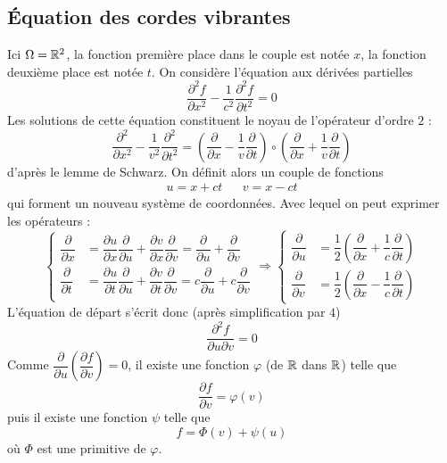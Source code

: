 \subsection{\'Equation des cordes vibrantes}
 Ici $\Omega=\mathbb{R}^2$, la fonction première place dans le couple est notée $x$, la fonction deuxième place est notée $t$. On considère l'équation aux dérivées partielles
\begin{displaymath}
 \dfrac{\partial ^2 f}{\partial x^2} -\dfrac{1}{c^2}\dfrac{\partial^2 f}{\partial t^2}=0
\end{displaymath}
Les solutions de cette équation constituent le noyau de l'opérateur d'ordre $2$ :
\begin{displaymath}
 \dfrac{\partial ^2 }{\partial x^2} -\dfrac{1}{v^2}\dfrac{\partial^2 }{\partial t^2} =
\left( \dfrac{\partial }{\partial x} -\dfrac{1}{v}\dfrac{\partial }{\partial t}\right) \circ 
\left( \dfrac{\partial }{\partial x} +\dfrac{1}{v}\dfrac{\partial }{\partial t}\right)
\end{displaymath}
d'après le lemme de Schwarz. On définit alors un couple de fonctions 
\begin{align*}
 u= x+ ct & & v=x-ct
\end{align*}
qui forment un nouveau système de coordonnées. Avec lequel on peut exprimer les opérateurs :
\begin{displaymath}
 \left\lbrace 
\begin{aligned}
 \dfrac{\partial }{\partial x} &= \dfrac{\partial u}{\partial x}\dfrac{\partial }{\partial u}+\dfrac{\partial v}{\partial x}\dfrac{\partial }{\partial v} 
= \dfrac{\partial }{\partial u}+\dfrac{\partial }{\partial v}\\
\dfrac{\partial }{\partial t} &= \dfrac{\partial u}{\partial t}\dfrac{\partial }{\partial u}+\dfrac{\partial v}{\partial t}\dfrac{\partial }{\partial v} 
= c\dfrac{\partial }{\partial u}+c\dfrac{\partial }{\partial v}\\
\end{aligned}
\right. 
\Rightarrow
\left\lbrace 
\begin{aligned}
 \dfrac{\partial }{\partial u} &=\dfrac{1}{2}\left( \dfrac{\partial }{\partial x} +\dfrac{1}{c}\dfrac{\partial }{\partial t}\right) \\ 
\dfrac{\partial }{\partial v} &=\dfrac{1}{2}\left( \dfrac{\partial }{\partial x} -\dfrac{1}{c}\dfrac{\partial }{\partial t}\right) 
\end{aligned}
\right. 
\end{displaymath}
L'équation de départ s'écrit donc (après simplification par $4$)
\begin{displaymath}
 \dfrac{\partial^2 f}{\partial u \partial v} = 0
\end{displaymath}
Comme $\dfrac{\partial}{\partial u}\left(\dfrac{\partial f}{\partial v} \right)=0$, il existe une fonction $\varphi$ (de $\mathbb{R}$ dans $\mathbb{R}$) telle que 
\begin{displaymath}
 \dfrac{\partial f}{\partial v} = \varphi(v)
\end{displaymath}
puis il existe une fonction $\psi$ telle que 
\begin{displaymath}
 f = \Phi(v) + \psi(u)
\end{displaymath}
où $\Phi$ est une primitive de $\varphi$.
